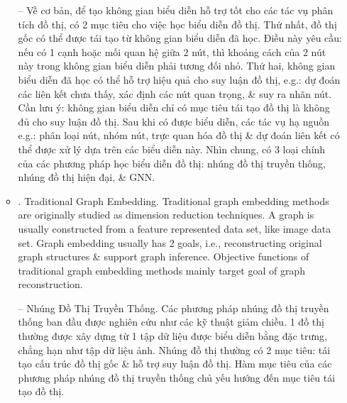 \documentclass{article}
\begin{document}
\begin{itemize}
\begin{itemize}
        -- Về cơ bản, để tạo không gian biểu diễn hỗ trợ tốt cho các tác vụ phân tích đồ thị, có 2 mục tiêu cho việc học biểu diễn đồ thị. Thứ nhất, đồ thị gốc có thể được tái tạo từ không gian biểu diễn đã học. Điều này yêu cầu: nếu có 1 cạnh hoặc mối quan hệ giữa 2 nút, thì khoảng cách của 2 nút này trong không gian biểu diễn phải tương đối nhỏ. Thứ hai, không gian biểu diễn đã học có thể hỗ trợ hiệu quả cho suy luận đồ thị, e.g.: dự đoán các liên kết chưa thấy, xác định các nút quan trọng, \& suy ra nhãn nút. Cần lưu ý: không gian biểu diễn chỉ có mục tiêu tái tạo đồ thị là không đủ cho suy luận đồ thị. Sau khi có được biểu diễn, các tác vụ hạ nguồn e.g.: phân loại nút, nhóm nút, trực quan hóa đồ thị \& dự đoán liên kết có thể được xử lý dựa trên các biểu diễn này. Nhìn chung, có 3 loại chính của các phương pháp học biểu diễn đồ thị: nhúng đồ thị truyền thống, nhúng đồ thị hiện đại, \& GNN.
        \item {. Traditional Graph Embedding.} Traditional graph embedding methods are originally studied as dimension reduction techniques. A graph is usually constructed from a feature represented data set, like image data set. Graph embedding usually has 2 goals, i.e., reconstructing original graph structures \& support graph inference. Objective functions of traditional graph embedding methods mainly target goal of graph reconstruction.

        -- {\sf Nhúng Đồ Thị Truyền Thống.} Các phương pháp nhúng đồ thị truyền thống ban đầu được nghiên cứu như các kỹ thuật giảm chiều. 1 đồ thị thường được xây dựng từ 1 tập dữ liệu được biểu diễn bằng đặc trưng, chẳng hạn như tập dữ liệu ảnh. Nhúng đồ thị thường có 2 mục tiêu: tái tạo cấu trúc đồ thị gốc \& hỗ trợ suy luận đồ thị. Hàm mục tiêu của các phương pháp nhúng đồ thị truyền thống chủ yếu hướng đến mục tiêu tái tạo đồ thị.


\end{itemize}
\end{itemize}
\end{document}
